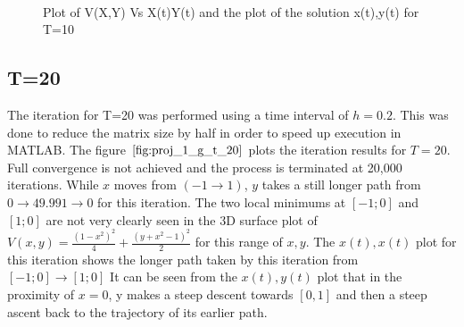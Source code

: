 \documentclass[twoside,12pt]{article}
\begin{document}
{\begin{figure}[htbp!]
\begin{center}
{                    }\\ %
    \end{center}
    \caption{%
     Plot of V(X,Y) Vs X(t)Y(t) and the plot of the solution x(t),y(t) for T=10
     }%
   \label{fig:proj_1_g_t_10}
\end{figure}
}

\FloatBarrier
\subsection{T=20}
{
The iteration for T=20 was performed using a time interval of $h=0.2$. This was done to reduce the matrix size by half in order to speed up execution in MATLAB. The figure $\eqref{fig:proj_1_g_t_20}$ plots the iteration results for $T=20$. Full convergence is not achieved and the process is terminated at 20,000 iterations. While $x$ moves from $(-1 \to 1)$, $y$ takes a still longer path from $0 \to 49.991 \to 0$ for this iteration. The two local minimums at $[-1;0]$ and $[1;0]$ are not very clearly seen in the 3D surface plot of $V(x,y) =  \frac{(1-x^2)^2}{4} + \frac{(y+x^2-1)^2}{2}$ for this range of $x,y$. The $x(t),x(t)$ plot for this iteration shows the longer path taken by this iteration from $[-1;0] \to [1;0]$ It can be seen from the $x(t),y(t)$ plot that in the proximity of $x=0$, y makes a  steep descent towards $[0,1]$ and then a steep ascent back to the trajectory of its earlier path.
\begin{figure}[htbp!]
     \begin{center}
            \hspace*{-1.4in}           
\end{center}
\end{figure}}
\end{document}

